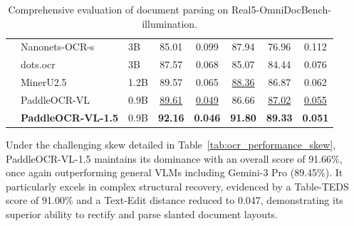 \documentclass[11pt, a4paper,logo,  copyright, nonumbering]{paddleocr}
\begin{document}
\begin{table}[H]
{\begin{tabular}{l|ll|c|c c c c}
         & Nanonets-OCR-s~\cite{Nanonets-OCR-S} & 3B & 85.01 & 0.099 & 87.94 & 76.96 & 0.112 \\
         & dots.ocr~\cite{dotsocr} & 3B & 87.57 & 0.068 & 85.07 & 84.44 & 0.076 \\
         & MinerU2.5~\cite{niu2025mineru2} & 1.2B & 89.57 & 0.065 & \cellcolor{cyan!15}\underline{88.36} & 86.87 & 0.062 \\
         & PaddleOCR-VL ~\cite{cui2025paddleocrvl}& 0.9B & \cellcolor{cyan!15}\underline{89.61} & \cellcolor{cyan!15}\underline{0.049} & 86.66 & \cellcolor{cyan!15}\underline{87.02} & \cellcolor{cyan!15}\underline{0.055} \\ 
         & \textbf{PaddleOCR-VL-1.5} & 0.9B & \cellcolor{red!15}\textbf{92.16} & \cellcolor{red!15}\textbf{0.046} & \cellcolor{red!15}\textbf{91.80} & \cellcolor{red!15}\textbf{89.33} & \cellcolor{red!15}\textbf{0.051} \\
        \bottomrule
    \end{tabular}%
    }
    \caption{Comprehensive evaluation of document parsing on Real5-OmniDocBench-illumination.}
    \label{tab:ocr_performance_illumination}
\end{table}


Under the challenging skew detailed in Table~\ref{tab:ocr_performance_skew}, PaddleOCR-VL-1.5 maintains its dominance with an overall score of 91.66\%, once again outperforming general VLMs including Gemini-3 Pro (89.45\%). It particularly excels in complex structural recovery, evidenced by a Table-TEDS score of 91.00\% and a Text-Edit distance reduced to 0.047, demonstrating its superior ability to rectify and parse slanted document layouts.
\end{document}
